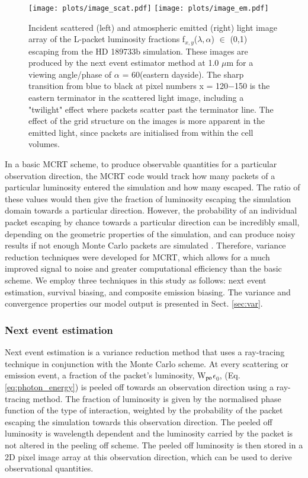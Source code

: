 \documentclass{aa}
\begin{document}
\begin{figure*}
   \centering
   \texttt{[image: plots/image\_scat.pdf]} 
   \texttt{[image: plots/image\_em.pdf]}
   \caption{Incident scattered (left) and atmospheric emitted (right) light image array of the L-packet luminosity fractions f$_{x,y}$($\lambda, \alpha$) $\in$ (0,1) escaping from the HD 189733b simulation.
   These images are produced by the next event estimator method at 1.0 $\mu$m for a viewing angle/phase of $\alpha$ = 60\degr (eastern dayside).
   The sharp transition from blue to black at pixel numbers x = 120$-$150 is the eastern terminator in the scattered light image, including a "twilight" effect where packets scatter past the terminator line.
   The effect of the grid structure on the images is more apparent in the emitted light, since packets are initialised from within the cell volumes.}
   \label{fig:peeloff_example}
\end{figure*}

In a basic MCRT scheme, to produce observable quantities for a particular observation direction, the MCRT code would track how many packets of a particular luminosity entered the simulation and how many escaped.
The ratio of these values would then give the fraction of luminosity escaping the simulation domain towards a particular direction.
However, the probability of an individual packet escaping by chance towards a particular direction can be incredibly small, depending on the geometric properties of the simulation, and can produce noisy results if not enough Monte Carlo packets are simulated \citep[e.g. see][]{Dupree2002}.
Therefore, variance reduction techniques were developed for MCRT, which allows for a much improved signal to noise and greater computational efficiency than the basic scheme.
We employ three techniques in this study as follows: next event estimation, survival biasing, and composite emission biasing.
The variance and convergence properties our model output is presented in Sect. \ref{sec:var}.

\subsubsection{Next event estimation}
\label{sec:peelingoff}
Next event estimation \citep[e.g.][]{Yusef-Zadeh1984, Wood1999} is a variance reduction method that uses a ray-tracing technique in conjunction with the Monte Carlo scheme.
At every scattering or emission event, a fraction of the packet's luminosity, W$_{\rm po}$$\epsilon_{0}$, (Eq. \ref{eq:photon_energy}) is peeled off towards an observation direction using a ray-tracing method.
The fraction of luminosity is given by the normalised phase function of the type of interaction, weighted by the probability of the packet escaping the simulation towards this observation direction.
The peeled off luminosity is wavelength dependent and the luminosity carried by the packet is not altered in the peeling off scheme.
The peeled off luminosity is then stored in a 2D pixel image array at this observation direction, which can be used to derive observational quantities.
\end{document}
